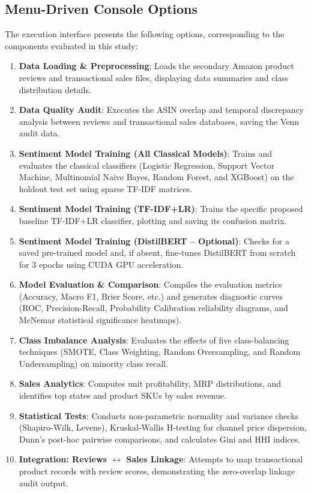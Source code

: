 \documentclass[11pt]{article}
\begin{document}
\subsection{Menu-Driven Console Options}
The execution interface presents the following options, corresponding to the components evaluated in this study:
\begin{enumerate}
    \item \textbf{Data Loading \& Preprocessing}: Loads the secondary Amazon product reviews and transactional sales files, displaying data summaries and class distribution details.
    \item \textbf{Data Quality Audit}: Executes the ASIN overlap and temporal discrepancy analysis between reviews and transactional sales databases, saving the Venn audit data.
    \item \textbf{Sentiment Model Training (All Classical Models)}: Trains and evaluates the classical classifiers (Logistic Regression, Support Vector Machine, Multinomial Naive Bayes, Random Forest, and XGBoost) on the holdout test set using sparse TF-IDF matrices.
    \item \textbf{Sentiment Model Training (TF-IDF+LR)}: Trains the specific proposed baseline TF-IDF+LR classifier, plotting and saving its confusion matrix.
    \item \textbf{Sentiment Model Training (DistilBERT -- Optional)}: Checks for a saved pre-trained model and, if absent, fine-tunes DistilBERT from scratch for 3 epochs using CUDA GPU acceleration.
    \item \textbf{Model Evaluation \& Comparison}: Compiles the evaluation metrics (Accuracy, Macro F1, Brier Score, etc.) and generates diagnostic curves (ROC, Precision-Recall, Probability Calibration reliability diagrams, and McNemar statistical significance heatmaps).
    \item \textbf{Class Imbalance Analysis}: Evaluates the effects of five class-balancing techniques (SMOTE, Class Weighting, Random Oversampling, and Random Undersampling) on minority class recall.
    \item \textbf{Sales Analytics}: Computes unit profitability, MRP distributions, and identifies top states and product SKUs by sales revenue.
    \item \textbf{Statistical Tests}: Conducts non-parametric normality and variance checks (Shapiro-Wilk, Levene), Kruskal-Wallis H-testing for channel price dispersion, Dunn's post-hoc pairwise comparisons, and calculates Gini and HHI indices.
    \item \textbf{Integration: Reviews $\leftrightarrow$ Sales Linkage}: Attempts to map transactional product records with review scores, demonstrating the zero-overlap linkage audit output.

\end{enumerate}
\end{document}

